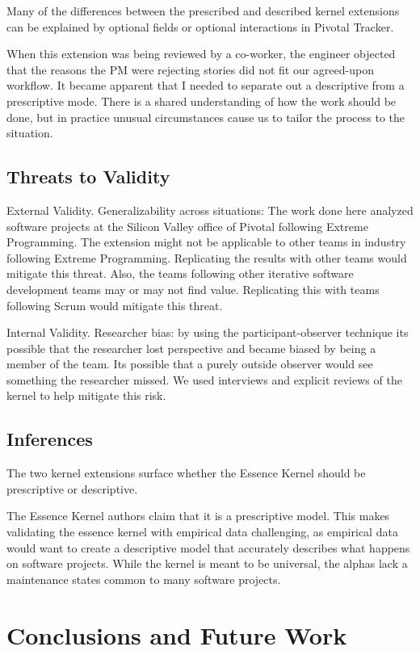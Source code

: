 \documentclass[preprint,12pt,3p]{elsarticle}
\begin{document}
Many of the differences between the prescribed and described kernel extensions can be explained by optional fields or optional interactions in Pivotal Tracker.

When this extension was being reviewed by a co-worker, the engineer objected that the reasons the PM were rejecting stories did not fit our agreed-upon workflow. It became apparent that I needed to separate out a descriptive from a prescriptive mode. There is a shared understanding of how the work should be done, but in practice unusual circumstances cause us to tailor the process to the situation.


\subsection{Threats to Validity}

External Validity. Generalizability across situations: The work done here analyzed software projects at the Silicon Valley office of Pivotal following Extreme Programming. The extension might not be applicable to other teams in industry following Extreme Programming. Replicating the results with other teams would mitigate this threat. Also, the teams following other iterative software development teams may or may not find value. Replicating this with teams following Scrum would mitigate this threat.

Internal Validity. Researcher bias: by using the participant-observer technique its possible that the researcher lost perspective and became biased by being a member of the team. Its possible that a purely outside observer would see something the researcher missed. We used interviews and explicit reviews of the kernel to help mitigate this risk.

\subsection{Inferences}

The two kernel extensions surface whether the Essence Kernel should be prescriptive or descriptive.

The Essence Kernel authors claim that it is a prescriptive model. This makes validating the essence kernel with empirical data challenging, as empirical data would want to create a descriptive model that accurately describes what happens on software projects. While the kernel is meant to be universal, the alphas lack a maintenance states common to many software projects.

\section{Conclusions and Future Work}
\end{document}
